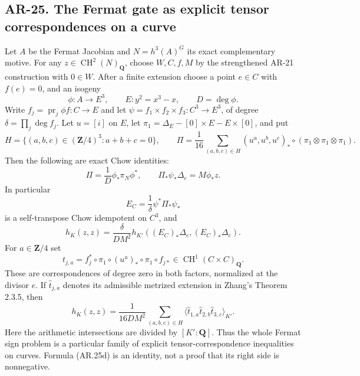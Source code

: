 \subsection*{AR-25. The Fermat gate as explicit tensor correspondences on a curve}

\begin{proposition}[AR-25]
Let $A$ be the Fermat Jacobian and $N=h^3(A)^G$ its exact
complementary motive.  For any $z\in\operatorname{CH}^2(N)_\mathbf Q$,
choose $W,C,f,M$ by the strengthened AR-21 construction with
$0\in W$.  After a finite extension choose a point $e\in C$ with
$f(e)=0$, and an isogeny
\[
 \phi:A\longrightarrow E^3,\qquad E:y^2=x^3-x,
 \qquad D=\deg\phi.
\]
Write $f_j=\operatorname{pr}_j\phi f:C\to E$ and let
$\psi=f_1\times f_2\times f_3:C^3\to E^3$, of degree
$\delta=\prod_j\deg f_j$.  Let $u=[i]$ on $E$, let
$\pi_1=\Delta_E-[0]\times E-E\times[0]$, and put
\[
 H=\{(a,b,c)\in(\mathbf Z/4)^3:a+b+c=0\},\qquad
 \Pi=\frac1{16}\sum_{(a,b,c)\in H}
    (u^a,u^b,u^c)_*\circ(\pi_1\otimes\pi_1\otimes\pi_1).
                                                               \tag{AR.25a}
\]
Then the following are exact Chow identities:
\[
 \Pi=\frac1D\phi_*\pi_N\phi^*,\qquad
 \Pi_*\psi_*\Delta_e=M\phi_*z.                         \tag{AR.25b}
\]
In particular
\[
 E_C=\frac1\delta\psi^*\Pi_*\psi_*
\]
is a self-transpose Chow idempotent on $C^3$, and
\[
 h_K(z,z)=\frac{\delta}{D M^2}
          h_{K'}((E_C)_*\Delta_e,(E_C)_*\Delta_e).       \tag{AR.25c}
\]
For $a\in\mathbf Z/4$ set
\[
 t_{j,a}=f_j^*\circ\pi_1\circ(u^a)_*\circ\pi_1\circ f_{j*}
       \in\operatorname{CH}^1(C\times C)_\mathbf Q.
\]
These are correspondences of degree zero in both factors,
normalized at the divisor $e$.  If $\widehat t_{j,a}$ denotes its
admissible metrized extension in Zhang's Theorem 2.3.5, then
\[
 h_K(z,z)=\frac1{16D M^2}
    \sum_{(a,b,c)\in H}
       \bigl\langle\widehat t_{1,a}\widehat t_{2,b}
                                  \widehat t_{3,c}\bigr\rangle_{K'}.
                                                               \tag{AR.25d}
\]
Here the arithmetic intersections are divided by $[K':\mathbf Q]$.
Thus the whole Fermat sign problem is a particular family of
explicit tensor-correspondence inequalities on curves.  Formula
(AR.25d) is an identity, not a proof that its right side is
nonnegative.
\end{proposition}

